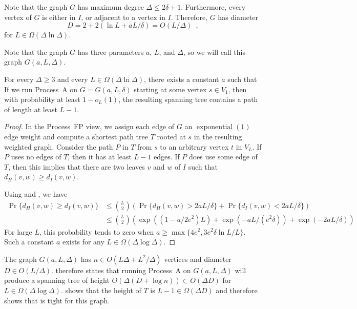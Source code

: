 \documentclass{patmorin}
\DeclareMathOperator{\exponential}{exponential}
\begin{document}
Note that the graph $G$ has maximum degree $\Delta\le 2\delta+1$.
Furthermore, every vertex of $G$ is either in $I$, or adjacent to a
vertex in $I$.  Therefore, $G$ has diameter
\[
    D = 2+2(\ln L + aL/\delta) = O(L/\Delta) \enspace ,
\]
for $L\in\Omega(\Delta\ln\Delta)$.

Note that the graph $G$ has three parameters $a$, $L$, and $\Delta$,
so we will call this graph $G(a,L,\Delta)$.
%
\begin{thm}
  For every $\Delta\ge 3$ and every $L\in\Omega(\Delta\ln\Delta)$, there
  exists a constant $a$ such that If we run Process~A on $G=G(a,L,\delta)$
  starting at some vertex $s\in V_1$, then with probability at least
  $1-o_L(1)$, the resulting spanning tree contains a path of length at
  least $L-1$.
\end{thm}

\begin{proof}
  In the Process~FP view, we assign each edge of $G$ an $\exponential(1)$
  edge weight and compute a shortest path tree $T$ rooted at $s$ in
  the resulting weighted graph.  Consider the path $P$ in $T$ from $s$
  to an arbitrary vertex $t$ in $V_L$.  If $P$ uses no edges of $T$,
  then it has at least $L-1$ edges.  If $P$ does use some edge of $T$,
  then this implies that there are two leaves $v$ and $w$ of $I$ such
  that $d_H(v,w) \ge d_I(v,w)$.

  Using  and , we have
  \begin{align*}
     \Pr\{d_H(v,w) \ge d_I(v,w)\}
       & \le \binom{L}{2}\left(\Pr\{d_H(v,w) > 2aL/\delta\} + \Pr\{d_I(v,w) < 2aL/\delta\}\right)  \\
       & \le \binom{L}{2}\left(\exp((1-a/2e^2)L) 
                + \exp(-aL/(e^2\delta)) 
                + \exp(-2aL/\delta)
              \right)
  \end{align*}
  For large $L$, this probability tends to zero when $a\ge \max\{4e^2, 3e^2\delta\ln L/L\}$.  Such a constant $a$ exists for any $L\in\Omega(\Delta\log\Delta)$.
\end{proof}


The graph $G(a,L,\Delta)$ has $n\in O(L\Delta+L^2/\Delta)$ vertices
and diameter $D\in O(L/\Delta)$.  
therefore states that running Process~A on $G(a,L,\Delta)$ will produce
a spanning tree of height $O(\Delta(D+\log n)) \subset O(\Delta D)$ for
$L\in\Omega(\Delta\log\Delta)$.   shows 
that the height of $T$ is $L-1\in\Omega(\Delta D)$ and therefore
shows that  is tight for this graph.
\end{document}
